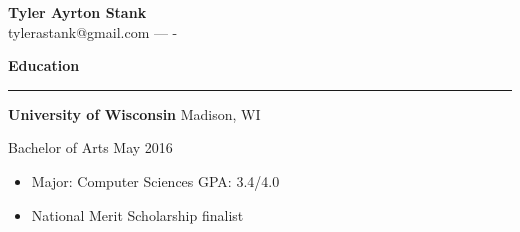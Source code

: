 \documentclass[12pt,letterpaper]{article}
\newenvironment{details}{
    \vspace{-.8em}
    \begin{itemize}
        \renewcommand \labelitemi{\labelitemiv}
        \setlength{\itemsep}{0pt}
        \setlength{\parskip}{-1pt}
        \setlength{\parsep}{0pt}
    }{
    \end{itemize}
    \vspace{-.5em}
}
\newcommand{\hr} {
    \vspace{-1em}
    \par\rule{\textwidth}{1pt}
    \vspace{-1.5em}
}
\newcommand{\ressection}[1] {
    \par{\large \textbf{#1}}
    \hr
}
\newenvironment{education} {
    \ressection{Education}
}{
    \vspace{0.5em}
}
\newcommand{\educator}[4] {
    \textbf{#1}
    \hfill #2
    \par #3 \hfill #4
    \par%
}
\begin{document}
\thispagestyle{empty}

\begin{centering}
    {\huge \textbf{Tyler Ayrton Stank}}\\
    tylerastank@gmail.com ---  -\\
\end{centering}

\begin{education}

\educator{University of Wisconsin}{Madison, WI}{Bachelor of Arts}{May 2016}
\begin{details}
    \item Major: Computer Sciences \hfill GPA: 3.4/4.0
    \item National Merit Scholarship finalist
\end{details}
\end{education}
\end{document}
